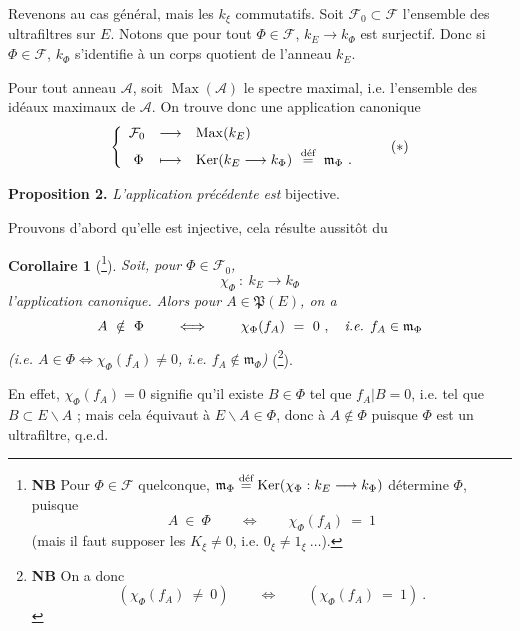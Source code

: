 \documentclass[11pt]{article}
\newcommand{\printedpage}[1]{\marginpar{\footnotesize p.~#1}}
\newcommand{\msp}[1]{\marginpar{\footnotesize [#1]}}
\newcommand{\defeq}{\overset{\text{\upshape déf}}{=}}
\newcommand{\Ker}{\operatorname{Ker}}
\newcommand{\cF}{\mathcal{F}}
\newcommand{\cA}{\mathcal{A}}
\newcommand{\Max}{\operatorname{Max}}
\begin{document}
\noindent Revenons au cas général, mais les $k_\xi$ commutatifs. Soit $\cF_0\subset\cF$ l'ensemble des ultrafiltres sur $E$. Notons que pour tout $\Phi\in\cF$, $k_E\longrightarrow k_\Phi$ est surjectif. Donc si $\Phi\in\cF$, $k_\Phi$ s'identifie à un corps quotient de l'anneau $k_E$.

\printedpage{193}

\msp{page 5}
\noindent Pour tout anneau $\cA$, soit $\Max(\cA)$ le spectre maximal, i.e. l'ensemble des idéaux maximaux de $\cA$. On trouve donc une application canonique
\[
\left\{
\begin{array}{lll}
\cF_0 & \longrightarrow & \Max(k_E)\\[1ex]
\ \Phi & \longmapsto & \Ker(k_E\longrightarrow k_\Phi) \ \defeq \ \mathfrak{m}_\Phi \ .
\end{array}\right. \tag*{$(*)$}
\]

\noindent\textbf{Proposition 2.} \textit{L'application précédente est} bijective.

\noindent Prouvons d'abord qu'elle est injective, cela résulte aussitôt du

\noindent\textbf{Corollaire 1} (\footnote[204]{\textbf{NB} Pour $\Phi\in\cF$ quelconque, $\mathfrak{m}_\Phi\defeq\Ker(\chi_\Phi : k_E\longrightarrow k_\Phi)$ détermine $\Phi$, puisque
\[
A \ \in \ \Phi \qquad\iff\qquad \chi_\Phi(f_A) \ = \ 1
\]
(mais il faut supposer les $K_\xi\neq0$, i.e. $0_\xi\neq1_\xi\ \ldots$).}). \textit{Soit, pour $\Phi\in\cF_0$,}
\[
\chi_\Phi \ : \ k_E \longrightarrow k_\Phi
\]
\textit{l'application canonique. Alors pour $A\in\mathfrak{P}(E)$, on a}
\[
A \ \notin \ \Phi \qquad\iff\qquad \chi_\Phi(f_A) \ = \ 0 \ , \quad \text{\textit{i.e.} } f_A\in\mathfrak{m}_\Phi
\]
\textit{(i.e. $A\in\Phi\iff\chi_\Phi(f_A)\neq0$, i.e. $f_A\notin\mathfrak{m}_\Phi$)} (\footnote[205]{\textbf{NB} On a donc
\[
(\chi_\Phi(f_A) \ \neq \ 0) \qquad\iff\qquad (\chi_\Phi(f_A) \ = \ 1) \ .
\]}).

\noindent En effet, $\chi_\Phi(f_A)=0$ signifie qu'il existe $B\in\Phi$ tel que $f_A|B=0$, i.e. tel que $B\subset E\backslash A$ ; mais cela équivaut à $E\backslash A\in\Phi$, donc à $A\notin\Phi$ puisque $\Phi$ est un ultrafiltre, q.e.d.
\end{document}
